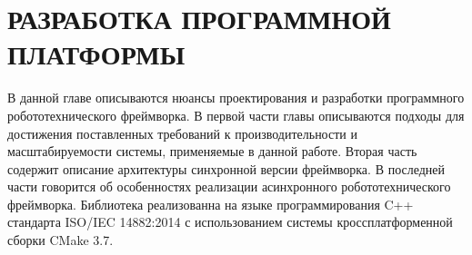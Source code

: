 \chapter{РАЗРАБОТКА ПРОГРАММНОЙ ПЛАТФОРМЫ}

В данной главе описываются нюансы проектирования и разработки программного робототехнического фреймворка. В первой части главы описываются подходы для достижения поставленных требований к производительности и масштабируемости системы, применяемые в данной работе. Вторая часть содержит описание архитектуры синхронной версии фреймворка. В последней части говорится об особенностях реализации асинхронного робототехнического фреймворка. Библиотека реализованна на языке программирования C++ стандарта ISO/IEC 14882:2014 с использованием системы кроссплатформенной сборки CMake 3.7.




